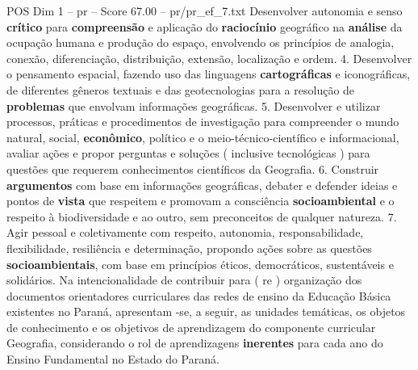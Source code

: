 \begin{textsample}{POS Dim 1 – pr – Score 67.00 – pr/pr\_ef\_7.txt}
Desenvolver autonomia e senso \textbf{crítico} para \textbf{compreensão} e aplicação do \textbf{raciocínio} geográfico na \textbf{análise} da ocupação humana e produção do espaço, envolvendo os princípios de analogia, conexão, diferenciação, distribuição, extensão, localização e ordem. 4.
Desenvolver o pensamento espacial, fazendo uso das linguagens \textbf{cartográficas} e iconográficas, de diferentes gêneros textuais e das geotecnologias para a resolução de \textbf{problemas} que envolvam informações geográficas. 5.
Desenvolver e utilizar processos, práticas e procedimentos de investigação para compreender o mundo natural, social, \textbf{econômico}, político e o meio-técnico-científico e informacional, avaliar ações e propor perguntas e soluções ( inclusive tecnológicas ) para questões que requerem conhecimentos científicos da Geografia. 6.
Construir \textbf{argumentos} com base em informações geográficas, debater e defender ideias e pontos de \textbf{vista} que respeitem e promovam a consciência \textbf{socioambiental} e o respeito à biodiversidade e ao outro, sem preconceitos de qualquer natureza. 7.
Agir pessoal e coletivamente com respeito, autonomia, responsabilidade, flexibilidade, resiliência e determinação, propondo ações sobre as questões \textbf{socioambientais}, com base em princípios éticos, democráticos, sustentáveis e solidários.
Na intencionalidade de contribuir para ( re ) organização dos documentos orientadores curriculares das redes de ensino da Educação Básica existentes no Paraná, apresentam -se, a seguir, as unidades temáticas, os objetos de conhecimento e os objetivos de aprendizagem do componente curricular Geografia, considerando o rol de aprendizagens \textbf{inerentes} para cada ano do Ensino Fundamental no Estado do Paraná.

\end{textsample}
